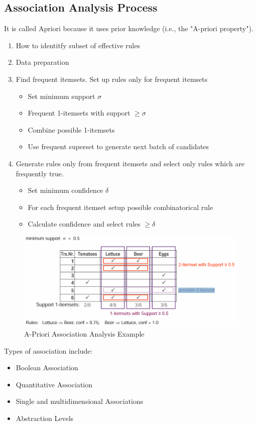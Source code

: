 \documentclass[../Main.tex]{subfiles}
\begin{document}
\subsection{Association Analysis Process}
It is called Apriori because it uses prior knowledge (i.e., the "A-priori property").
\begin{enumerate}
    \item How to identitfy subset of effective rules
    \item Data preparation
    \item Find frequent itemsets. Set up rules only for frequent itemsets
    \begin{itemize}
        \item Set minimum support \(\sigma\)
        \item Frequent 1-itemsets with support \(\geq \sigma\)
        \item Combine possible 1-itemsets
        \item Use frequent superset to generate next batch of candidates
    \end{itemize}
    \item Generate rules only from frequent itemsets and select only rules which are frequently true.
    \begin{itemize}
        \item Set minimum confidence \(\delta\)
        \item For each frequent itemset setup possible combinatorical rule
        \item Calculate confidence and select rules \(\geq \delta\)
    \end{itemize}
\end{enumerate}

\begin{figure}[H]
    \centering
    \includegraphics[width=0.75\linewidth]{Images/datan/a-priori-association-example.png}
    \caption{A-Priori Association Analysis Example}
\end{figure}

Types of association include:
\begin{itemize}
    \item Boolean Association
    \item Quantitative Association
    \item Single and multidimensional Associations
    \item Abstraction Levels
\end{itemize}
\end{document}
